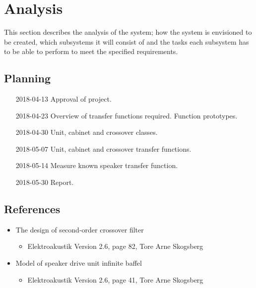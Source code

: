
\chapter{Analysis}

This section describes the analysis of the system; how the system is envisioned to be created, which subsystems it will consist of and the tasks each subsystem has to be able to perform to meet the specified requirements.

\section{Planning}

\begin{itemize}
	\item[2018-04-13] Approval of project.
	\item[2018-04-23] Overview of transfer functions required. Function prototypes.
	\item[2018-04-30] Unit, cabinet and crossover classes.
	\item[2018-05-07] Unit, cabinet and crossover transfer functions. 
	\item[2018-05-14] Measure known speaker transfer function. 
	\item[2018-05-30] Report.
\end{itemize}

\section{References}
\begin{itemize}
	\item The design of second-order crossover filter
	\begin{itemize}
		\item Elektroakustik Version 2.6, page 82, Tore Arne Skogsberg
	\end{itemize}
	\item Model of speaker drive unit infinite baffel
	\begin{itemize}
		\item Elektroakustik Version 2.6, page 41, Tore Arne Skogsberg
	\end{itemize}
\end{itemize}



\FloatBarrier

